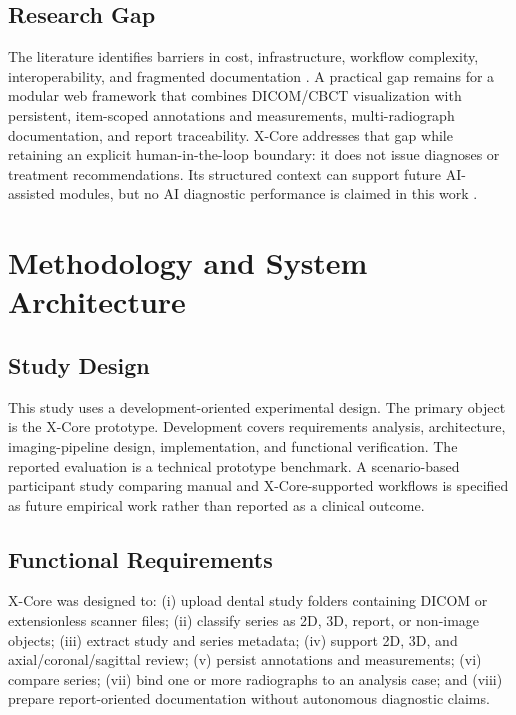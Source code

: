 \documentclass[journal]{IEEEtran}
\begin{document}
\subsection{Research Gap}

The literature identifies barriers in cost, infrastructure, workflow complexity, interoperability, and fragmented documentation \cite{ref:nascimento2023,ref:owolabi2022,ref:schwendicke2025}. A practical gap remains for a modular web framework that combines DICOM/CBCT visualization with persistent, item-scoped annotations and measurements, multi-radiograph documentation, and report traceability. X-Core addresses that gap while retaining an explicit human-in-the-loop boundary: it does not issue diagnoses or treatment recommendations. Its structured context can support future AI-assisted modules, but no AI diagnostic performance is claimed in this work \cite{ref:uribe2024,ref:katsumata2023,ref:ding2023}.

\section{Methodology and System Architecture}
\label{sec:methodology}

\subsection{Study Design}

This study uses a development-oriented experimental design. The primary object is the X-Core prototype. Development covers requirements analysis, architecture, imaging-pipeline design, implementation, and functional verification. The reported evaluation is a technical prototype benchmark. A scenario-based participant study comparing manual and X-Core-supported workflows is specified as future empirical work rather than reported as a clinical outcome.

\subsection{Functional Requirements}

X-Core was designed to: (i) upload dental study folders containing DICOM or extensionless scanner files; (ii) classify series as 2D, 3D, report, or non-image objects; (iii) extract study and series metadata; (iv) support 2D, 3D, and axial/coronal/sagittal review; (v) persist annotations and measurements; (vi) compare series; (vii) bind one or more radiographs to an analysis case; and (viii) prepare report-oriented documentation without autonomous diagnostic claims.
\end{document}
